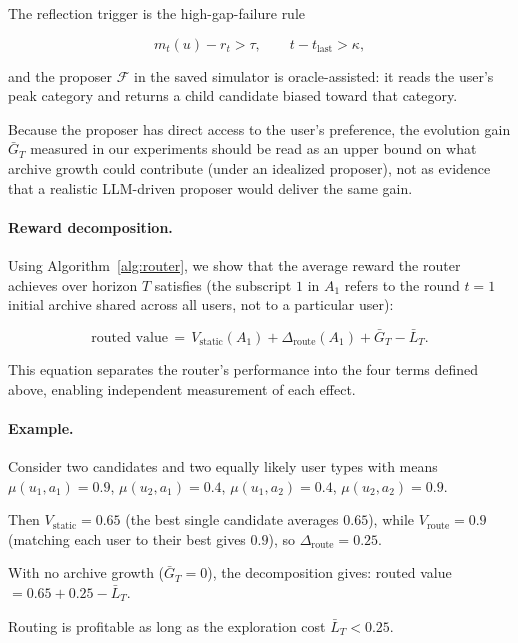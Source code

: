 \documentclass{article} %
\begin{document}
The reflection trigger is the high-gap-failure rule

\begin{equation}
\label{eq:method-trigger}
m_t(u) - r_t > \tau,\qquad t - t_{\mathrm{last}} > \kappa,
\end{equation}

and the proposer $\mathcal{F}$ in the saved simulator is oracle-assisted: it reads the user's peak category and returns a child candidate biased toward that category.

Because the proposer has direct access to the user's preference, the evolution gain $\bar G_T$ measured in our experiments should be read as an upper bound on what archive growth could contribute (under an idealized proposer), not as evidence that a realistic LLM-driven proposer would deliver the same gain.

\paragraph{Reward decomposition.}
Using Algorithm~\ref{alg:router}, we show that the average reward the router achieves over horizon $T$ satisfies (the subscript $1$ in $A_1$ refers to the round $t=1$ initial archive shared across all users, not to a particular user):

\begin{equation}
\label{eq:method-thesis}
\text{routed value}
\,=\, V_{\mathrm{static}}(A_1) + \Delta_{\mathrm{route}}(A_1) + \bar G_T - \bar L_T.
\end{equation}

This equation separates the router's performance into the four terms defined above, enabling independent measurement of each effect.

\paragraph{Example.} Consider two candidates and two equally likely user types with means $\mu(u_1,a_1)=0.9$, $\mu(u_2,a_1)=0.4$, $\mu(u_1,a_2)=0.4$, $\mu(u_2,a_2)=0.9$.

Then $V_{\mathrm{static}}=0.65$ (the best single candidate averages $0.65$), while $V_{\mathrm{route}}=0.9$ (matching each user to their best gives $0.9$), so $\Delta_{\mathrm{route}}=0.25$.

With no archive growth ($\bar G_T=0$), the decomposition gives: routed value $= 0.65 + 0.25 - \bar L_T$.

Routing is profitable as long as the exploration cost $\bar L_T < 0.25$.
\end{document}
